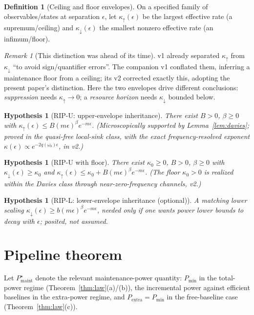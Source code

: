 \documentclass[11pt,a4paper]{article}
\theoremstyle{plain}
\newtheorem{hypothesis}[theorem]{Hypothesis}
\theoremstyle{definition}
\newtheorem{definition}[theorem]{Definition}
\theoremstyle{remark}
\newtheorem{remark}[theorem]{Remark}
\newcommand{\eps}{\epsilon}
\newcommand{\Pextra}{P_{\mathrm{extra}}}
\newcommand{\Pmin}{P_{\min}}
\newcommand{\kup}{\kappa_{\uparrow}}
\newcommand{\kdn}{\kappa_{\downarrow}}
\begin{document}
\begin{definition}[Ceiling and floor envelopes]
On a specified family of observables/states at separation $\eps$, let
$\kup(\eps)$ be the largest effective rate (a supremum/ceiling) and
$\kdn(\eps)$ the smallest nonzero effective rate (an infimum/floor).
\end{definition}

\begin{remark}[This distinction was ahead of its time]
v1 already separated $\kup$ from $\kdn$ ``to avoid sign/quantifier errors''.
The companion \cite{Stress} v1 conflated them, inferring a maintenance floor
from a ceiling; its v2 corrected exactly this, adopting the present paper's
distinction. Here the two envelopes drive different conclusions:
\emph{suppression} needs $\kup \to 0$; a \emph{resource horizon} needs
$\kdn$ bounded below.
\end{remark}

\begin{hypothesis}[RIP-U: upper-envelope inheritance]\label{hyp:ripU}
There exist $B > 0$, $\beta \ge 0$ with $\kup(\eps) \le
B(m\eps)^\beta e^{-m\eps}$. (Microscopically supported by
Lemma~\ref{lem:davies}; \emph{proved} in the quasi-free local-sink class,
with the exact frequency-resolved exponent $\kappa(\eps) \propto
e^{-2q(\omega_b)\eps}$, in \cite{HCut} v2.)
\end{hypothesis}

\begin{hypothesis}[RIP-U with floor]\label{hyp:floor}
There exist $\kappa_0 \ge 0$, $B > 0$, $\beta \ge 0$ with
$\kdn(\eps) \ge \kappa_0$ and $\kup(\eps) \le \kappa_0 +
B(m\eps)^\beta e^{-m\eps}$. (The floor $\kappa_0 > 0$ is realized within the
Davies class through near-zero-frequency channels, \cite{Stress} v2.)
\end{hypothesis}

\begin{hypothesis}[RIP-L: lower-envelope inheritance (optional)]\label{hyp:ripL}
A matching lower scaling $\kdn(\eps) \ge b(m\eps)^\beta e^{-m\eps}$, needed
only if one wants power \emph{lower} bounds to \emph{decay} with $\eps$;
posited, not assumed.
\end{hypothesis}

\section{Pipeline theorem}

Let $P^\star_{\mathrm{maint}}$ denote the relevant maintenance-power
quantity: $\Pmin$ in the total-power regime (Theorem~\ref{thm:law}(a)/(b)),
the incremental power against efficient baselines in the extra-power regime,
and $\Pextra = \Pmin$ in the free-baseline case
(Theorem~\ref{thm:law}(c)).
\end{document}
